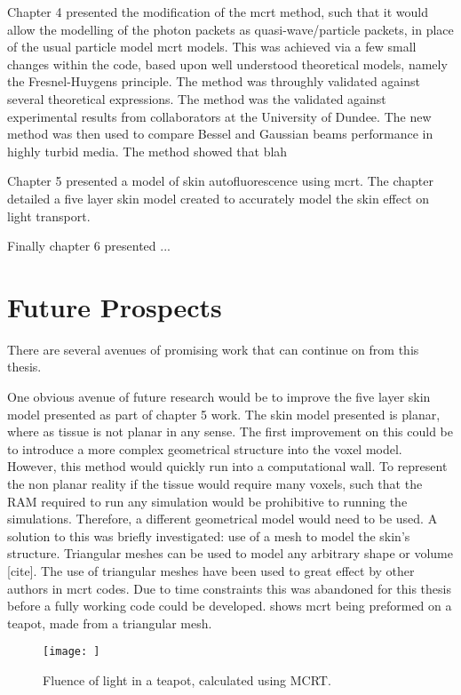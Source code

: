 \medskip

Chapter 4 presented the modification of the \gls*{mcrt} method, such that it would allow the modelling of the photon packets as quasi-wave/particle packets, in place of the usual particle model \gls*{mcrt} models.
This was achieved via a few small changes within the code, based upon well understood theoretical models, namely the Fresnel-Huygens principle.
The method was throughly validated against several theoretical expressions.
The method was the validated against experimental results from collaborators at the University of Dundee.
The new method was then used to compare Bessel and Gaussian beams performance in highly turbid media.
The method showed that blah

\medskip

Chapter 5 presented a model of skin autofluorescence using \gls*{mcrt}.
The chapter detailed a five layer skin model created to accurately model the skin effect on light transport.

\medskip

Finally chapter 6 presented ...

\section{Future Prospects}

There are several avenues of promising work that can continue on from this thesis.

One obvious avenue of future research would be to improve the five layer skin model presented as part of chapter 5 work.
The skin model presented is planar, where as tissue is not planar in any sense.
The first improvement on this could be to introduce a more complex geometrical structure into the voxel model.
However, this method would quickly run into a computational wall.
To represent the non planar reality if the tissue would require many voxels, such that the RAM required to run any simulation would be prohibitive to running the simulations.
Therefore, a different geometrical model would need to be used.
A solution to this was briefly investigated: use of a mesh to model the skin's structure.
Triangular meshes can be used to model any arbitrary shape or volume [cite].
The use of triangular meshes have been used to great effect by other authors in \gls*{mcrt} codes.
Due to time constraints this was abandoned for this thesis before a fully working code could be developed.
 shows \gls*{mcrt} being preformed on a teapot, made from a triangular mesh.

\begin{figure}[!htpb]
    \centering
    \texttt{[image: ]}
    \caption{Fluence of light in a teapot, calculated using MCRT.}
    \label{fig:fmesh}
\end{figure}

